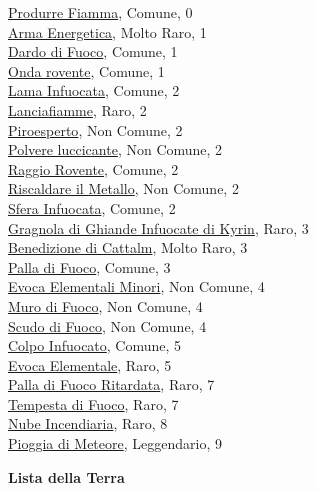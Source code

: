 \begin{multicols}{3}
{{\hyperlink{Produrre Fiamma}{Produrre Fiamma}, Comune, 0\\
\hyperlink{Arma Energetica}{Arma Energetica}, Molto Raro, 1\\
\hyperlink{Dardo di Fuoco}{Dardo di Fuoco}, Comune, 1\\
\hyperlink{Onda rovente}{Onda rovente}, Comune, 1\\
\hyperlink{Lama Infuocata}{Lama Infuocata}, Comune, 2\\
\hyperlink{Lanciafiamme}{Lanciafiamme}, Raro, 2\\
\hyperlink{Piroesperto}{Piroesperto}, Non Comune, 2\\
\hyperlink{Polvere luccicante}{Polvere luccicante}, Non Comune, 2\\
\hyperlink{Raggio Rovente}{Raggio Rovente}, Comune, 2\\
\hyperlink{Riscaldare il Metallo}{Riscaldare il Metallo}, Non Comune, 2\\
\hyperlink{Sfera Infuocata}{Sfera Infuocata}, Comune, 2\\
\hyperlink{Gragnola di Ghiande Infuocate di Kyrin}{Gragnola di Ghiande Infuocate di Kyrin}, Raro, 3\\
\hyperlink{Benedizione di Cattalm}{Benedizione di Cattalm}, Molto Raro, 3\\
\hyperlink{Palla di Fuoco}{Palla di Fuoco}, Comune, 3\\
\hyperlink{Evoca Elementali Minori}{Evoca Elementali Minori}, Non Comune, 4\\
\hyperlink{Muro di Fuoco}{Muro di Fuoco}, Non Comune, 4\\
\hyperlink{Scudo di Fuoco}{Scudo di Fuoco}, Non Comune, 4\\
\hyperlink{Colpo Infuocato}{Colpo Infuocato}, Comune, 5\\
\hyperlink{Evoca Elementale}{Evoca Elementale}, Raro, 5\\
\hyperlink{Palla di Fuoco Ritardata}{Palla di Fuoco Ritardata}, Raro, 7\\
\hyperlink{Tempesta di Fuoco}{Tempesta di Fuoco}, Raro, 7\\
\hyperlink{Nube Incendiaria}{Nube Incendiaria}, Raro, 8\\
\hyperlink{Pioggia di Meteore}{Pioggia di Meteore}, Leggendario, 9

\medskip\textbf{Lista della Terra}

}}
\end{multicols}
